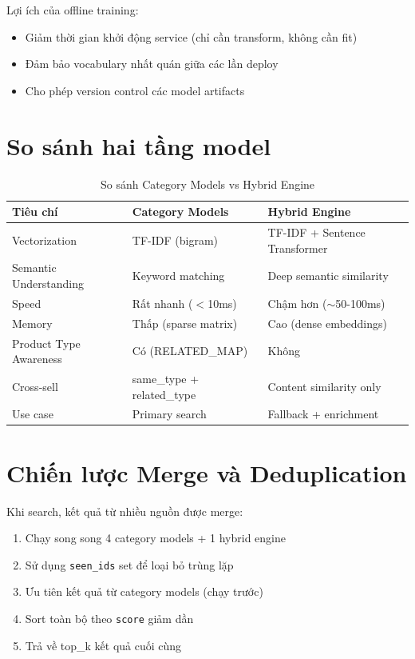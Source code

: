 \documentclass[12pt,a4paper]{report}
\begin{document}
Lợi ích của offline training:
\begin{itemize}
    \item Giảm thời gian khởi động service (chỉ cần transform, không cần fit)
    \item Đảm bảo vocabulary nhất quán giữa các lần deploy
    \item Cho phép version control các model artifacts
\end{itemize}

\section{So sánh hai tầng model}

\begin{table}[H]
\centering
\caption{So sánh Category Models vs Hybrid Engine}
\label{tab:model_comparison}
\begin{tabular}{p{3.5cm}p{5.5cm}p{5.5cm}}
\toprule
\textbf{Tiêu chí} & \textbf{Category Models} & \textbf{Hybrid Engine} \\
\midrule
Vectorization & TF-IDF (bigram) & TF-IDF + Sentence Transformer \\
Semantic Understanding & Keyword matching & Deep semantic similarity \\
Speed & Rất nhanh ($<$10ms) & Chậm hơn ($\sim$50-100ms) \\
Memory & Thấp (sparse matrix) & Cao (dense embeddings) \\
Product Type Awareness & Có (RELATED\_MAP) & Không \\
Cross-sell & same\_type + related\_type & Content similarity only \\
Use case & Primary search & Fallback + enrichment \\
\bottomrule
\end{tabular}
\end{table}

\section{Chiến lược Merge và Deduplication}

Khi search, kết quả từ nhiều nguồn được merge:

\begin{enumerate}
    \item Chạy song song 4 category models + 1 hybrid engine
    \item Sử dụng \texttt{seen\_ids} set để loại bỏ trùng lặp
    \item Ưu tiên kết quả từ category models (chạy trước)
    \item Sort toàn bộ theo \texttt{score} giảm dần
    \item Trả về top\_k kết quả cuối cùng
\end{enumerate}
\end{document}
